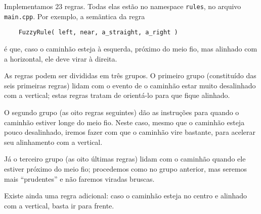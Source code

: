 \documentclass{article}
\begin{document}
Implementamos 23 regras. Todas elas estão no namespace \lstinline"rules",
no arquivo \lstinline"main.cpp".
Por exemplo, a semãntica da regra
\begin{lstlisting}
    FuzzyRule( left, near, a_straight, a_right )
\end{lstlisting}
é que, caso o caminhão esteja à esquerda, próximo do meio fio,
mas alinhado com a horizontal, ele deve virar à direita.

As regras podem ser divididas em três grupos.
O primeiro grupo (constituído das seis primeiras regras)
lidam com o evento de o caminhão estar muito desalinhado com a vertical;
estas regras tratam de orientá-lo para que fique alinhado.

O segundo grupo (as oito regras seguintes)
dão as instruções para quando o caminhão estiver longe do meio fio.
Neste caso, mesmo que o caminhão esteja pouco desalinhado,
iremos fazer com que o caminhão vire bastante,
para acelerar seu alinhamento com a vertical.

Já o terceiro grupo (as oito últimas regras)
lidam com o caminhão quando ele estiver próximo do meio fio;
procedemos como no grupo anterior,
mas seremos mais ``prudentes'' e não faremos viradas bruscas.

Existe ainda uma regra adicional: caso o caminhão esteja no centro
e alinhado com a vertical, basta ir para frente.
\end{document}
